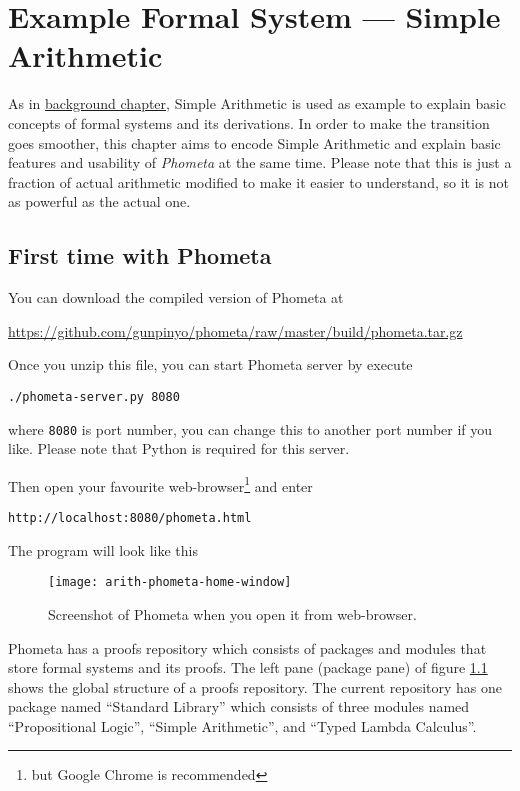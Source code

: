 \documentclass[master.tex]{subfiles}
\begin{document}
\chapter{Example Formal System --- Simple Arithmetic}
\label{chap:example_simple_arithmetic}

As in \hyperref[chap:background]{background chapter}, Simple Arithmetic is
used as example to explain basic concepts of formal systems and its derivations.
In order to make the transition goes smoother, this chapter aims to encode
Simple Arithmetic and explain basic features and usability of \emph{Phometa} at
the same time. Please note that this is just a fraction of
actual arithmetic modified to make it easier to understand, so it is not as
powerful as the actual one.

\section{First time with Phometa}

You can download the compiled version of Phometa at

{\centering\url{https://github.com/gunpinyo/phometa/raw/master/build/phometa.tar.gz}}

Once you unzip this file, you can start Phometa server by execute

\texttt{./phometa-server.py 8080}

where \texttt{8080} is port number, you can change this to another port number
if you like. Please note that Python is required for this server.

Then open your favourite web-browser\footnote{but Google Chrome is recommended}
and enter

\texttt{http://localhost:8080/phometa.html}

The program will look like this

\begin{figure}[H]
    \centering
    \texttt{[image: arith-phometa-home-window]}
    \caption{Screenshot of Phometa when you open it from web-browser.}
\label{fig:arith-phometa-home-window}
\end{figure}

Phometa has a proofs repository which consists of packages and modules that
store formal systems and its proofs. The left pane (package pane) of figure
\ref{fig:arith-phometa-home-window} shows the global structure of a proofs
repository. The current repository has one package named ``Standard Library''
which consists of three modules named ``Propositional Logic'', ``Simple
Arithmetic'', and ``Typed Lambda Calculus''.
\end{document}
